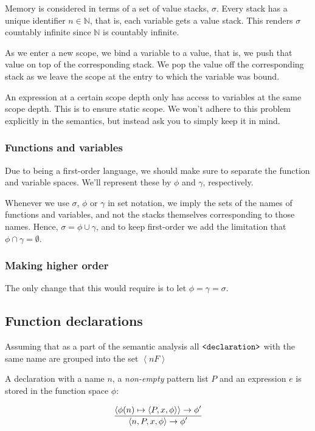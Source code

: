 Memory is considered in terms of a set of value stacks, $\sigma$. Every stack
has a unique identifier $n\in \mathbb{N}$, that is, each variable gets a value
stack. This renders $\sigma$ countably infinite since $\mathbb{N}$ is countably
infinite.

As we enter a new scope, we bind a variable to a
value, that is, we push that value on top of the corresponding stack. We pop
the value off the corresponding stack as we leave the scope at the entry to
which the variable was bound.

An expression at a certain scope depth only has access to variables at the same
scope depth. This is to ensure static scope. We won't adhere to this problem
explicitly in the semantics, but instead ask you to simply keep it in mind.

\subsubsection{Functions and variables}

Due to \D{} being a first-order language, we should make sure to separate the
function and variable spaces. We'll represent these by $\phi$ and $\gamma$,
respectively.

Whenever we use $\sigma$, $\phi$ or $\gamma$ in set notation, we imply the sets
of the names of functions and variables, and not the stacks themselves
corresponding to those names.  Hence, $\sigma=\phi\cup\gamma$, and to keep \D{}
first-order we add the limitation that $\phi\cap\gamma=\emptyset$.

\subsubsection{Making \D{} higher order}

The only change that this would require is to let $\phi=\gamma=\sigma$.

\subsection{Function declarations}

Assuming that as a part of the semantic analysis all $\text{{\ttfamily<declaration>}}$ with the same name are grouped into the set $\left\langle n F\right\rangle$

A declaration with a name $n$, a \emph{non-empty} pattern
list $P$ and an expression $e$ is stored in the function space $\phi$:

\begin{equation}\label{sem:declaration}
{\displaystyle
  \left\langle \phi(n)\mapsto \left\langle P, x, \phi\right\rangle\right\rangle
  \rightarrow
  \phi'
\over\displaystyle
  \left\langle n, P, x, \phi\right\rangle
  \rightarrow
  \phi'
}
\end{equation}

